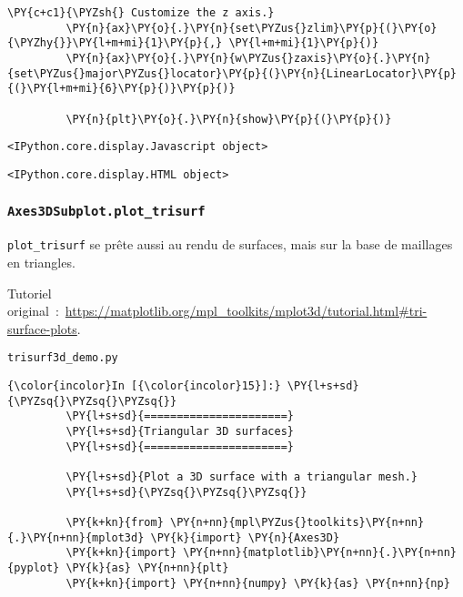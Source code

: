 \begin{Verbatim}[commandchars=\\\{\}]
         \PY{c+c1}{\PYZsh{} Customize the z axis.}
         \PY{n}{ax}\PY{o}{.}\PY{n}{set\PYZus{}zlim}\PY{p}{(}\PY{o}{\PYZhy{}}\PY{l+m+mi}{1}\PY{p}{,} \PY{l+m+mi}{1}\PY{p}{)}
         \PY{n}{ax}\PY{o}{.}\PY{n}{w\PYZus{}zaxis}\PY{o}{.}\PY{n}{set\PYZus{}major\PYZus{}locator}\PY{p}{(}\PY{n}{LinearLocator}\PY{p}{(}\PY{l+m+mi}{6}\PY{p}{)}\PY{p}{)}
         
         \PY{n}{plt}\PY{o}{.}\PY{n}{show}\PY{p}{(}\PY{p}{)}
\end{Verbatim}


    
    \begin{verbatim}
<IPython.core.display.Javascript object>
    \end{verbatim}

    
    
    \begin{verbatim}
<IPython.core.display.HTML object>
    \end{verbatim}

    
    \hypertarget{axes3dsubplot.plot_trisurf}{%
\subsubsection{\texorpdfstring{\texttt{Axes3DSubplot.plot\_trisurf}}{Axes3DSubplot.plot\_trisurf}}\label{axes3dsubplot.plot_trisurf}}

    \texttt{plot\_trisurf} se prête aussi au rendu de surfaces, mais sur la
base de maillages en triangles.

    Tutoriel
original~:~\url{https://matplotlib.org/mpl_toolkits/mplot3d/tutorial.html\#tri-surface-plots}.

    \texttt{trisurf3d\_demo.py}

    \begin{Verbatim}[commandchars=\\\{\}]
{\color{incolor}In [{\color{incolor}15}]:} \PY{l+s+sd}{\PYZsq{}\PYZsq{}\PYZsq{}}
         \PY{l+s+sd}{======================}
         \PY{l+s+sd}{Triangular 3D surfaces}
         \PY{l+s+sd}{======================}
         
         \PY{l+s+sd}{Plot a 3D surface with a triangular mesh.}
         \PY{l+s+sd}{\PYZsq{}\PYZsq{}\PYZsq{}}
         
         \PY{k+kn}{from} \PY{n+nn}{mpl\PYZus{}toolkits}\PY{n+nn}{.}\PY{n+nn}{mplot3d} \PY{k}{import} \PY{n}{Axes3D}
         \PY{k+kn}{import} \PY{n+nn}{matplotlib}\PY{n+nn}{.}\PY{n+nn}{pyplot} \PY{k}{as} \PY{n+nn}{plt}
         \PY{k+kn}{import} \PY{n+nn}{numpy} \PY{k}{as} \PY{n+nn}{np}
\end{Verbatim}



